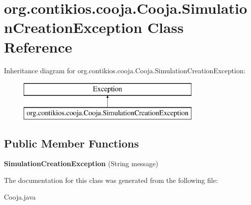 \hypertarget{classorg_1_1contikios_1_1cooja_1_1Cooja_1_1SimulationCreationException}{\section{org.\-contikios.\-cooja.\-Cooja.\-Simulation\-Creation\-Exception Class Reference}
\label{classorg_1_1contikios_1_1cooja_1_1Cooja_1_1SimulationCreationException}
}
Inheritance diagram for org.\-contikios.\-cooja.\-Cooja.\-Simulation\-Creation\-Exception\-:\begin{figure}[H]
\begin{center}
\leavevmode
\includegraphics[height=2.000000cm]{classorg_1_1contikios_1_1cooja_1_1Cooja_1_1SimulationCreationException}
\end{center}
\end{figure}
\subsection*{Public Member Functions}
\begin{DoxyCompactItemize}
\item 
\hypertarget{classorg_1_1contikios_1_1cooja_1_1Cooja_1_1SimulationCreationException_ae22e2d685fd114e651eb2d3e678f69fd}{{\bfseries Simulation\-Creation\-Exception} (String message)}\label{classorg_1_1contikios_1_1cooja_1_1Cooja_1_1SimulationCreationException_ae22e2d685fd114e651eb2d3e678f69fd}

\end{DoxyCompactItemize}


The documentation for this class was generated from the following file\-:\begin{DoxyCompactItemize}
\item 
Cooja.\-java\end{DoxyCompactItemize}
